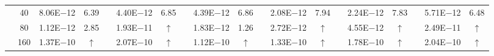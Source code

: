 \begin{table}[H]
{\begin{tabular}{@{}l c c c c c c c c c c c c c c c c c c@{}}
 & 40 & 8.06E$-$12 & 6.39 &  & 4.40E$-$12 & 6.85 &  & 4.39E$-$12 & 6.86 &  & 2.08E$-$12 & 7.94 & & 2.24E$-$12 & 7.83 & & 5.71E$-$12 & 6.48\\
 & 80 & 1.12E$-$12 & 2.85 &  & 1.93E$-$11 & $\uparrow$ &  & 1.83E$-$12 & 1.26 &  & 2.72E$-$12 & $\uparrow$ & & 4.55E$-$12 & $\uparrow$ & & 2.49E$-$11 & $\uparrow$\\
 & 160 & 1.37E$-$10 & $\uparrow$ &  & 2.07E$-$10 & $\uparrow$ &  & 1.12E$-$10 & $\uparrow$ &  & 1.33E$-$10 & $\uparrow$ & & 1.78E$-$10 & $\uparrow$ & & 2.04E$-$10 & $\uparrow$\\
\bottomrule
\end{tabular}}
\label{PRO:bending:01_01_glob1_full_weights}
\end{table}
